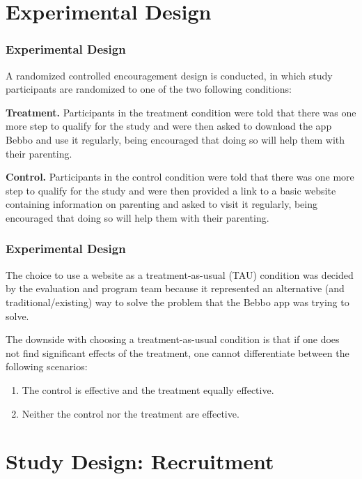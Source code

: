 \documentclass[aspectratio=169]{beamer}
\begin{document}
\section{Experimental Design}

\begin{frame}
  \frametitle{Experimental Design}

A randomized controlled encouragement design is conducted, in which study participants are randomized to one of the two following conditions:

\textbf{Treatment.} Participants in the treatment condition were told that there was one more step to qualify for the study and were then asked to download the app Bebbo and use it regularly, being encouraged that doing so will help them with their parenting.

\textbf{Control.} Participants in the control condition were told that there was one more step to qualify for the study and were then provided a link to a basic website containing information on parenting and asked to visit it regularly, being encouraged that doing so will help them with their parenting.

\end{frame}

\begin{frame}
    \frametitle{Experimental Design}

The choice to use a website as a treatment-as-usual (TAU) condition was decided by the evaluation and program team because it represented an alternative (and traditional/existing) way to solve the problem that the Bebbo app was trying to solve.

The downside with choosing a treatment-as-usual condition is that if one does not find significant effects of the treatment, one cannot differentiate between the following scenarios:

\begin{enumerate}
\item The control is effective and the treatment equally effective.
\item Neither the control nor the treatment are effective.
\end{enumerate}


\end{frame}

\section{Study Design: Recruitment}
\end{document}
